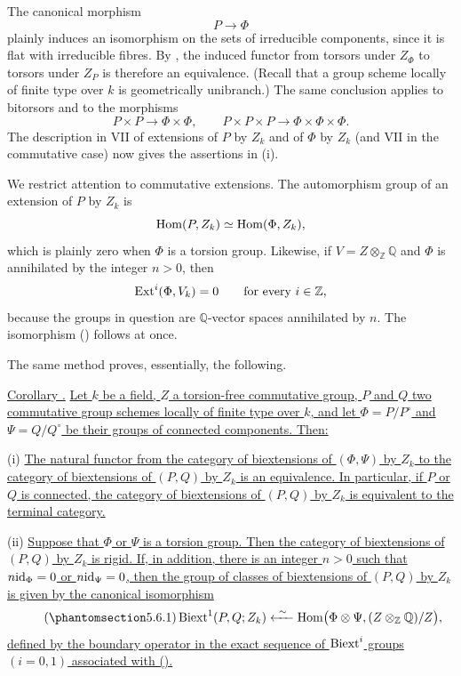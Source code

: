 The canonical morphism
\[
 P\longrightarrow\Phi
\]
plainly induces an isomorphism on the sets of irreducible components,
since it is flat with irreducible fibres.  By , the induced functor
from torsors under $Z_\Phi$ to torsors under $Z_P$ is therefore an
equivalence.  (Recall that a group scheme locally of finite type over
$k$ is geometrically unibranch.)  The same conclusion applies to
bitorsors and to the morphisms
\[
 P\times P\longrightarrow\Phi\times\Phi,
 \qquad
 P\times P\times P\longrightarrow\Phi\times\Phi\times\Phi.
\]
The description in VII  of extensions of $P$ by $Z_k$ and of
$\Phi$ by $Z_k$ (and VII  in the commutative case) now gives the
assertions in (i).

We restrict attention to commutative extensions.  The automorphism
group of an extension of $P$ by $Z_k$ is
\[
 \operatorname{Hom}(P,Z_k)\simeq\operatorname{Hom}(\Phi,Z_k),
\]
which is plainly zero when $\Phi$ is a torsion group.  Likewise, if
$V=Z\otimes_{\mathbb Z}\mathbb Q$ and $\Phi$ is annihilated by the
integer $n>0$, then
\[
 \operatorname{Ext}^i(\Phi,V_k)=0\qquad\text{for every }i\in\mathbb Z,
\]
because the groups in question are $\mathbb Q$-vector spaces
annihilated by $n$.  The isomorphism () follows at once.

The same method proves, essentially, the following.

\medskip
\noindent\underline{Corollary .}  \underline{Let $k$ be a field,
$Z$ a torsion-free commutative group, $P$ and $Q$ two commutative
group schemes locally of finite type over $k$, and let
$\Phi=P/P^\circ$ and $\Psi=Q/Q^\circ$ be their groups of connected
components.  Then:}

\smallskip
\noindent (i) \underline{The natural functor from the category of
biextensions of $(\Phi,\Psi)$ by $Z_k$ to the category of
biextensions of $(P,Q)$ by $Z_k$ is an equivalence.  In particular,
if $P$ or $Q$ is connected, the category of biextensions of $(P,Q)$
by $Z_k$ is equivalent to the terminal category.}

\smallskip
\noindent (ii) \underline{Suppose that $\Phi$ or $\Psi$ is a torsion
group.  Then the category of biextensions of $(P,Q)$ by $Z_k$ is
rigid.  If, in addition, there is an integer $n>0$ such that
$n\mathrm{id}_\Phi=0$ or $n\mathrm{id}_\Psi=0$, then the group of classes of
biextensions of $(P,Q)$ by $Z_k$ is given by the canonical
isomorphism}
\begin{equation}\tag{\SGARefTarget{sga7.sga7i.eviii.n5-6-1}{5.6.1}}
 \Biext^1(P,Q;Z_k)
 \xleftarrow{\ \sim\ }
 \Hom\bigl(\Phi\otimes\Psi,(Z\otimes_{\mathbb Z}\mathbb Q)/Z\bigr),
\end{equation}
\underline{defined by the boundary operator in the exact sequence of
$\operatorname{Biext}^i$ groups $(i=0,1)$ associated with ().}

